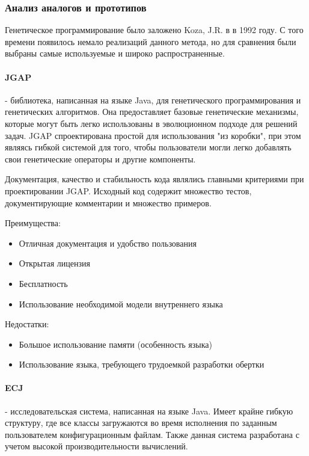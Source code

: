 \documentclass[russian,utf8,emptystyle]{eskdtext}
\begin{document}
\subsubsection{Анализ аналогов и прототипов}
Генетическое программирование было заложено Koza, J.R. в \cite{KozaTheBase} в 1992 году. С того времени появилось немало реализаций данного метода, но для сравнения были выбраны самые используемые и широко распространенные.

\paragraph{JGAP} - библиотека, написанная на языке Java, для генетического программирования и генетических алгоритмов. Она предоставляет базовые генетические механизмы, которые могут быть легко использованы в эволюционном подходе для решений задач. JGAP спроектирована простой для использования "из коробки", при этом являясь гибкой системой для того, чтобы пользователи могли легко добавлять свои генетические операторы и другие компоненты.

Документация, качество и стабильность кода являлись главными критериями при проектировании JGAP. Исходный код содержит множество тестов, документирующие комментарии и множество примеров.

Преимущества:
\begin{itemize}
\item Отличная документация и удобство пользования
\item Открытая лицензия
\item Бесплатность
\item Использование необходимой модели внутреннего языка
\end{itemize}

Недостатки:
\begin{itemize}
\item Большое использование памяти (особенность языка)
\item Использование языка, требующего трудоемкой разработки обертки 
\end{itemize}

\paragraph{ECJ} - исследовательская система, написанная на языке Java. Имеет крайне гибкую структуру, где все классы загружаются во время исполнения по заданным пользователем конфигурационным файлам. Также данная система разработана с учетом высокой производительности вычислений.
\end{document}
